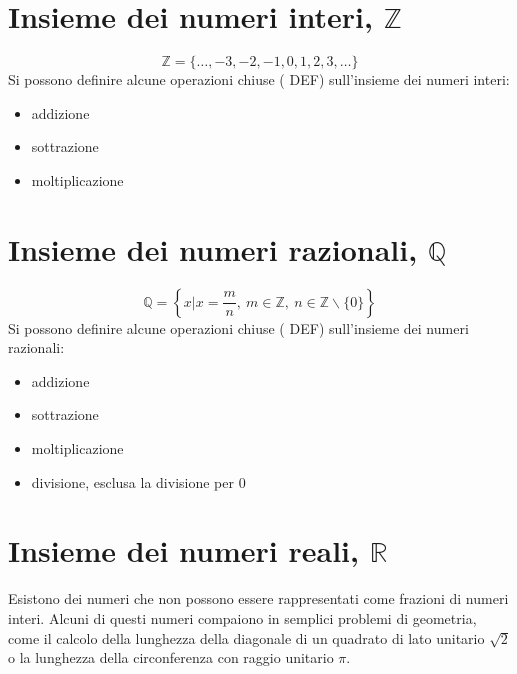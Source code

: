 \section{Insieme dei numeri interi, $\mathbb{Z}$}
\begin{equation}
    \mathbb{Z} = \{ \dots, -3, -2, -1, 0, 1, 2, 3, \dots \}
\end{equation}
Si possono definire alcune operazioni chiuse ({\color{red} DEF}) sull'insieme dei numeri interi:
\begin{itemize}
    \item addizione
    \item sottrazione
    \item moltiplicazione
\end{itemize}

\section{Insieme dei numeri razionali, $\mathbb{Q}$}
\begin{equation}
    \mathbb{Q} = \left\{ x | x = \dfrac{m}{n}, \ m \in \mathbb{Z}, \ n \in \mathbb{Z}\backslash\{0\} \right\}
\end{equation}
Si possono definire alcune operazioni chiuse ({\color{red} DEF}) sull'insieme dei numeri razionali:
\begin{itemize}
    \item addizione
    \item sottrazione
    \item moltiplicazione
    \item divisione, esclusa la divisione per $0$
\end{itemize}


\section{Insieme dei numeri reali, $\mathbb{R}$}
Esistono dei numeri che non possono essere rappresentati come frazioni di numeri interi. Alcuni di questi numeri compaiono in semplici problemi di geometria, come il calcolo della lunghezza della diagonale di un quadrato di lato unitario  $\sqrt{2}$ o la lunghezza della circonferenza con raggio unitario $\pi$.

